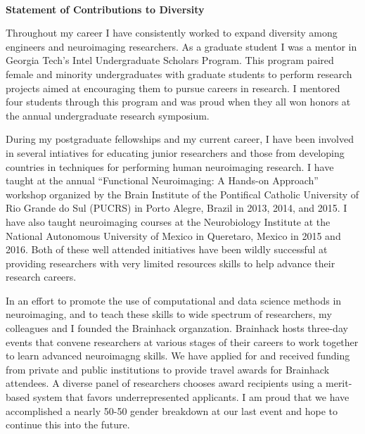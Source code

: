 \documentclass[letterpaper,11pt]{article}
\begin{document}
\thispagestyle{plain}

\raggedright

\begin{center}
{}\\
\bigskip{}
\textbf{\Large Statement of Contributions to Diversity}\\
\end{center}

Throughout my career I have consistently worked to expand  diversity among engineers and neuroimaging researchers. As a graduate student I was a mentor in Georgia Tech's Intel Undergraduate Scholars Program. This program paired female and minority undergraduates with graduate students to perform research projects aimed at encouraging them to pursue careers in research. I mentored four students through this program and was proud when they all won honors at the annual undergraduate research symposium.

During my postgraduate fellowships and my current career, I have been involved in several intiatives for educating junior researchers and those from developing countries in techniques for performing human neuroimaging research. I have taught at the annual ``Functional Neuroimaging: A Hands-on Approach'' workshop organized by the Brain Institute of the Pontifical Catholic University of Rio Grande do Sul (PUCRS) in Porto Alegre, Brazil in 2013, 2014, and 2015. I have also taught neuroimaging courses at the Neurobiology Institute at the National Autonomous University of Mexico in Queretaro, Mexico in 2015 and 2016. Both of these well attended initiatives have been wildly successful at providing researchers with very limited resources skills to help advance their research careers.

In an effort to promote the use of computational and data science methods in neuroimaging, and to teach these skills to wide spectrum of researchers, my colleagues and I founded the Brainhack organzation. Brainhack hosts three-day events that convene researchers at various stages of their careers to work together to learn advanced neuroimagng skills. We have applied for and received funding from private and public institutions to provide travel awards for Brainhack attendees. A diverse panel of researchers chooses award recipients using a merit-based system that favors underrepresented applicants. I am proud that we have accomplished a nearly 50-50 gender breakdown at our last event and hope to continue this into the future.
\end{document}
